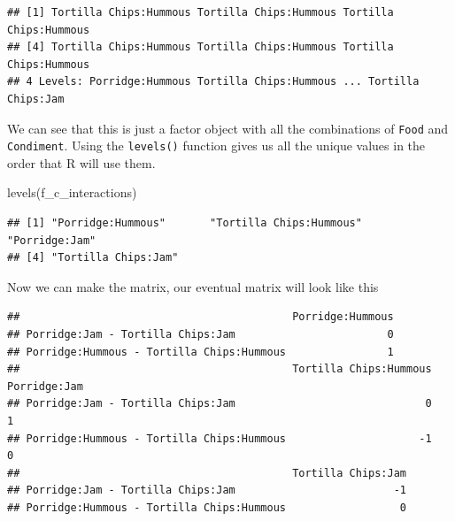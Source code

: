 \documentclass[
]{book}
\newenvironment{Shaded}{\begin{snugshade}}{\end{snugshade}}
\newcommand{\AttributeTok}[1]{\textcolor[rgb]{0.77,0.63,0.00}{#1}}
\newcommand{\FunctionTok}[1]{\textcolor[rgb]{0.00,0.00,0.00}{#1}}
\newcommand{\NormalTok}[1]{#1}
\newcommand{\OtherTok}[1]{\textcolor[rgb]{0.56,0.35,0.01}{#1}}
\newcommand{\SpecialCharTok}[1]{\textcolor[rgb]{0.00,0.00,0.00}{#1}}
\newcommand{\StringTok}[1]{\textcolor[rgb]{0.31,0.60,0.02}{#1}}
\begin{document}
\begin{Shaded}
\end{Shaded}

\begin{verbatim}
## [1] Tortilla Chips:Hummous Tortilla Chips:Hummous Tortilla Chips:Hummous
## [4] Tortilla Chips:Hummous Tortilla Chips:Hummous Tortilla Chips:Hummous
## 4 Levels: Porridge:Hummous Tortilla Chips:Hummous ... Tortilla Chips:Jam
\end{verbatim}

We can see that this is just a factor object with all the combinations of \texttt{Food} and \texttt{Condiment}. Using the \texttt{levels()} function gives us all the unique values in the order that R will use them.

\begin{Shaded}
\begin{Highlighting}[]
\FunctionTok{levels}\NormalTok{(f\_c\_interactions)}
\end{Highlighting}
\end{Shaded}

\begin{verbatim}
## [1] "Porridge:Hummous"       "Tortilla Chips:Hummous" "Porridge:Jam"          
## [4] "Tortilla Chips:Jam"
\end{verbatim}

Now we can make the matrix, our eventual matrix will look like this

\begin{verbatim}
##                                           Porridge:Hummous
## Porridge:Jam - Tortilla Chips:Jam                        0
## Porridge:Hummous - Tortilla Chips:Hummous                1
##                                           Tortilla Chips:Hummous Porridge:Jam
## Porridge:Jam - Tortilla Chips:Jam                              0            1
## Porridge:Hummous - Tortilla Chips:Hummous                     -1            0
##                                           Tortilla Chips:Jam
## Porridge:Jam - Tortilla Chips:Jam                         -1
## Porridge:Hummous - Tortilla Chips:Hummous                  0
\end{verbatim}
\end{document}
